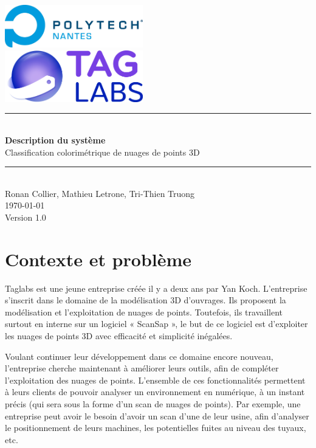 \documentclass[12pt,titlepage,french]{article}
\begin{document}
\begin{titlepage}
\newcommand{\HRule}{\rule{\linewidth}{0.5mm}}
\center

  \includegraphics[width=0.45\textwidth]{../ressources/img_logos/logo_polytech.png}\\[1cm]
   
  \includegraphics[width=0.45\textwidth]{../ressources/img_logos/logo_taglabs.png}


\HRule \\[0.4cm]
{ \huge \bfseries Description du système \\[0.15cm] }
Classification colorimétrique de nuages de points 3D
\HRule \\[1.5cm]
Ronan Collier,
Mathieu Letrone,
Tri-Thien Truong
\\[1cm]
\today \\ [1cm]
Version 1.0
\end{titlepage}

\tableofcontents %
\newpage
\listoffigures  %
\newpage
\section{Contexte et problème}

Taglabs est une jeune entreprise créée il y a deux ans par Yan Koch. L’entreprise s’inscrit dans le domaine de la modélisation 3D d’ouvrages. Ils proposent la modélisation et l’exploitation de nuages de points. Toutefois, ils travaillent surtout en interne sur un logiciel « ScanSap », le but de ce logiciel est d’exploiter les nuages de points 3D avec efficacité et simplicité inégalées.

Voulant continuer leur développement dans ce domaine encore nouveau, l'entreprise cherche maintenant à améliorer leurs outils, afin de compléter l'exploitation des nuages de points. L'ensemble de ces fonctionnalités permettent à leurs clients de pouvoir analyser un environnement en numérique, à un instant précis (qui sera sous la forme d'un scan de nuages de points). Par exemple, une entreprise peut avoir le besoin d'avoir un scan d'une de leur usine, afin d'analyser le positionnement de leurs machines, les potentielles fuites au niveau des tuyaux, etc.
\end{document}
